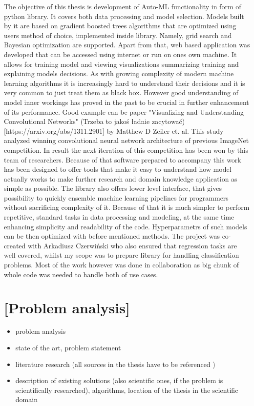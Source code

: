 \documentclass[a4paper,twoside,12pt]{book}
\begin{document}
\begin{itemize}
The objective of this thesis is development of Auto-ML functionality in form of python library. It covers both data processing and model selection. Models built by it are based on gradient boosted trees algorithms that are optimized using users method of choice, implemented inside library. Namely, grid search and Bayesian optimization are supported. Apart from that, web based application was developed that can be accessed using internet or run on ones own machine. It allows for training model and viewing visualizations summarizing training and explaining models decisions. As with growing complexity of modern machine learning algorithms it is increasingly hard to understand their decisions and it is very common to just treat them as black box. However good understanding of model inner workings has proved in the past to be crucial in further enhancement of its performance. Good example can be paper "Visualizing and Understanding Convolutional Networks" (Trzeba to jakoś ładnie zacytować)[https://arxiv.org/abs/1311.2901] by Matthew D Zeiler et. al. This study analyzed winning convolutional neural network architecture of previous ImageNet competition. In result the next iteration of this competition has been won by this team of researchers.
Because of that software prepared to accompany this work has been designed to offer tools that make it easy to understand how model actually works to  make further research and domain knowledge application as simple as possible.
The library also offers lower level interface, that gives possibility to quickly ensemble machine learning pipelines for programmers without sacrificing complexity of it. Because of that it is much simpler to perform repetitive, standard tasks in data processing and modeling, at the same time enhancing simplicity and readability of the code. Hyperparametrs of such models can be then optimized with before mentioned methods.
The project was co-created with Arkadiusz Czerwiński who also ensured that regression tasks are well covered, whilst my scope was to prepare library for handling classification problems. Most of the work however was done in collaboration as big chunk of whole code was needed to handle both of use cases.


\end{itemize}

\chapter{[Problem analysis]}

\begin{itemize}
\item  problem analysis
\item state of the art, problem statement
\item  literature research (all sources in the thesis have to be referenced \cite{bib:article,bib:book,bib:conference,bib:internet})
\item description of existing solutions (also scientific ones, if the problem is scientifically researched), algorithms,  location of the thesis in the scientific domain
\end{itemize}
\end{document}
